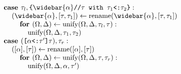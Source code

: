 \documentclass[acmsmall]{acmart}
\begin{document}
\begin{figure*}[h]
\[\begin{array}[t]{@{} l}
    \\

    \I \B{case } \tau_l, \code{\{$\widebar{\alpha}$//$\tau$ with $\tau_1$<:$\tau_2$\}} : 
    \\
    \I\I (\widebar{\alpha}, [\tau, \tau_1]) \leftarrow \F{rename}(\widebar{\alpha}, [\tau, \tau_1])
    \\
    \I\I\I \B{for } (\Omega, \Delta) \leftarrow \F{unify}(\Omega, \Delta, \tau_l, \tau):
    \\
    \I\I\I\I \F{unify}(\Omega, \Delta, \tau_1, \tau_2)

    \\

    \I \B{case } (\code{[$\alpha$<:$\tau'$]$\tau$}), \tau_r : 
    \\
    \I\I ([\alpha], [\tau]) \leftarrow \F{rename}([\alpha], [\tau])
    \\
    \I\I\I \B{for } (\Omega, \Delta) \leftarrow \F{unify}(\Omega, \Delta, \tau, \tau_r):
    \\
    \I\I\I\I \F{unify}(\Omega, \Delta, \alpha, \tau')




\end{array}\]
\end{figure*}
\end{document}
